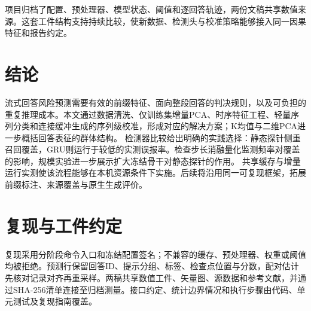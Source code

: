 项目归档了配置、预处理器、模型状态、阈值和逐回答轨迹，两份文稿共享数值来源。这套工件结构支持持续比较，使新数据、检测头与校准策略能够接入同一因果特征和报告约定。

\section{结论}
流式回答风险预测需要有效的前缀特征、面向整段回答的判决规则，以及可负担的重复推理成本。本文通过数据清洗、仅训练集增量PCA、时序特征工程、轻量序列分类和连接缓冲生成的序列级校准，形成对应的解决方案；K均值与二维PCA进一步概括回答表征的群体结构。\ReviewRankingZH{} 检测器比较给出明确的实践选择：静态探针侧重召回覆盖，GRU则运行于较低的实测误报率。检查步长消融量化监测频率对覆盖的影响，规模实验进一步展示扩大冻结骨干对静态探针的作用。\AchievementScaleZH{} 共享缓存与增量运行实测使该流程能够在本机资源条件下实施。后续将沿用同一可复现框架，拓展前缀标注、来源覆盖与原生生成评价。

\appendices
\section{复现与工件约定}
复现采用分阶段命令入口和冻结配置签名；不兼容的缓存、预处理器、权重或阈值均被拒绝。预测行保留回答ID、提示分组、标签、检查点位置与分数，配对估计先核对记录对齐再重采样。两稿共享数值工件、矢量图、源数据和参考文献，并通过SHA-256清单连接至归档测量。接口约定、统计边界情况和执行步骤由代码、单元测试及复现指南覆盖。
